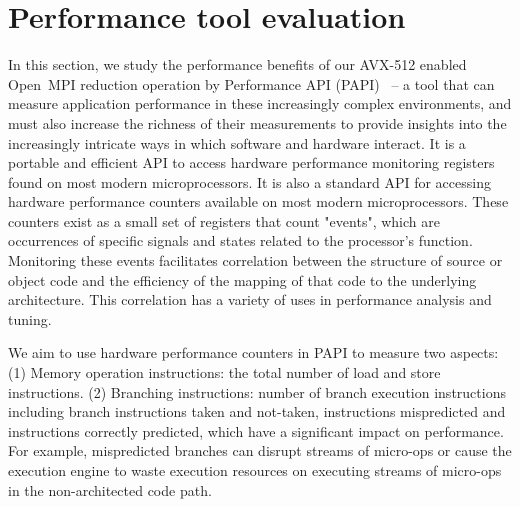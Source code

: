 \documentclass[sigconf]{acmart}
\newcommand{\ompi}[0]{Open~MPI\xspace}
\begin{document}
\section{Performance tool evaluation}\label{sec:perf}
In this section, we study the performance benefits of our AVX-512 enabled \ompi reduction
operation by Performance API (PAPI)~\cite{papi} -- a tool that can measure
application performance in these increasingly complex environments, and must also
increase the richness of their measurements to provide insights into the
increasingly intricate ways in which software and hardware interact.
It is a portable and efficient API to access hardware performance
monitoring registers found on most modern microprocessors.
It is also a standard API for accessing hardware
performance counters available on most modern microprocessors. These counters exist
as a small set of registers that count "events", which are occurrences of specific signals
and states related to the processor's function. Monitoring these events facilitates
correlation between the structure of source or object code and the efficiency of the mapping
of that code to the underlying architecture. This correlation has a variety of uses in
performance analysis and tuning.


We aim to use hardware performance counters in PAPI to measure two aspects:
(1) Memory operation instructions: the total number of load and store instructions.
(2) Branching instructions: number of branch execution instructions including branch instructions taken and not-taken,
instructions mispredicted and instructions correctly predicted, which have a significant impact on performance.
For example, mispredicted branches can disrupt streams of micro-ops or cause
the execution engine to waste execution resources on executing
streams of micro-ops in the non-architected code path.
\end{document}
